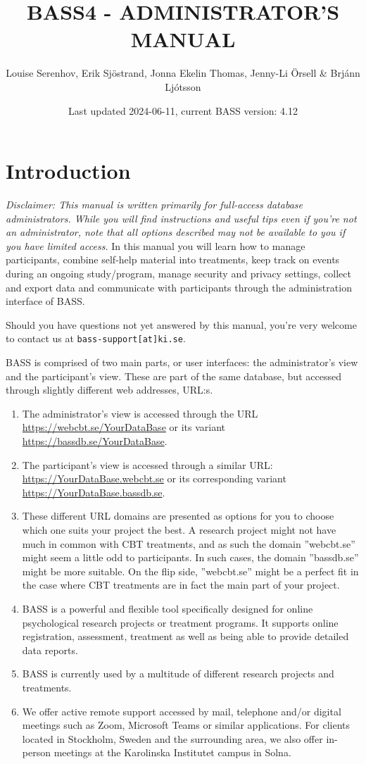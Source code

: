 \documentclass[
]{book}
\title{BASS4 - ADMINISTRATOR'S MANUAL}
\author{Louise Serenhov, Erik Sjöstrand, Jonna Ekelin Thomas, Jenny-Li Örsell \& Brjánn Ljótsson}
\date{Last updated 2024-06-11, current BASS version: 4.12}
\providecommand{\tightlist}{%
  \setlength{\itemsep}{0pt}\setlength{\parskip}{0pt}}
\begin{document}
\maketitle

{
\setcounter{tocdepth}{1}
\tableofcontents
}
\chapter{Introduction}\label{introduction}

\emph{Disclaimer: This manual is written primarily for full-access database administrators. While you will find instructions and useful tips even if you're not an administrator, note that all options described may not be available to you if you have limited access.}
In this manual you will learn how to manage participants, combine self-help material into treatments, keep track on events during an ongoing study/program, manage security and privacy settings, collect and export data and communicate with participants through the administration interface of BASS.

Should you have questions not yet answered by this manual, you're very welcome to contact us at \texttt{bass-support{[}at{]}ki.se}.

BASS is comprised of two main parts, or user interfaces: the administrator's view and the participant's view. These are part of the same database, but accessed through slightly different web addresses, URL:s.

\begin{enumerate}
\def\labelenumi{\arabic{enumi}.}
\tightlist
\item
  The administrator's view is accessed through the URL \url{https://webcbt.se/YourDataBase} or its variant \url{https://bassdb.se/YourDataBase}.
\item
  The participant's view is accessed through a similar URL: \url{https://YourDataBase.webcbt.se} or its corresponding variant \url{https://YourDataBase.bassdb.se}.
\item
  These different URL domains are presented as options for you to choose which one suits your project the best. A research project might not have much in common with CBT treatments, and as such the domain ''webcbt.se'' might seem a little odd to participants. In such cases, the domain ''bassdb.se'' might be more suitable. On the flip side, ''webcbt.se'' might be a perfect fit in the case where CBT treatments are in fact the main part of your project.
\item
  BASS is a powerful and flexible tool specifically designed for online psychological research projects or treatment programs. It supports online registration, assessment, treatment as well as being able to provide detailed data reports.
\item
  BASS is currently used by a multitude of different research projects and treatments.
\item
  We offer active remote support accessed by mail, telephone and/or digital meetings such as Zoom, Microsoft Teams or similar applications. For clients located in Stockholm, Sweden and the surrounding area, we also offer in-person meetings at the Karolinska Institutet campus in Solna.
\end{enumerate}
\end{document}
